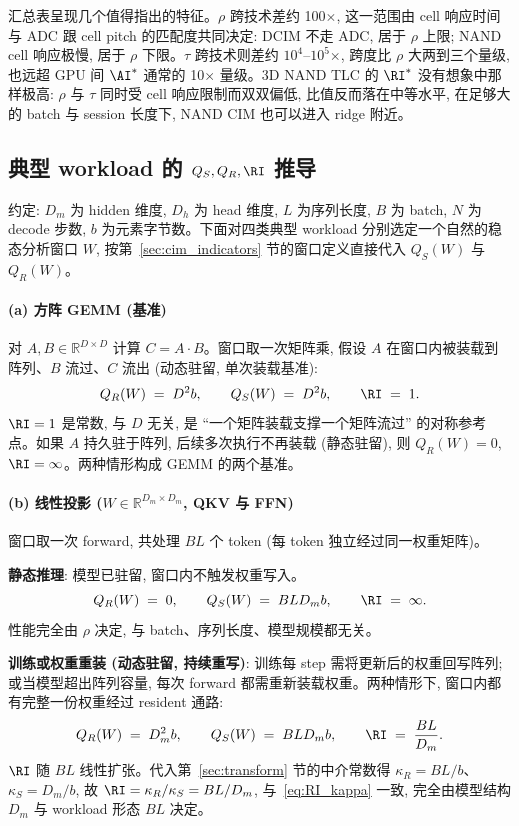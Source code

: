 汇总表呈现几个值得指出的特征。$\rho$ 跨技术差约 100$\times$, 这一范围由 cell 响应时间与 ADC 跟 cell pitch 的匹配度共同决定: DCIM 不走 ADC, 居于 $\rho$ 上限; NAND cell 响应极慢, 居于 $\rho$ 下限。$\tau$ 跨技术则差约 $10^4$--$10^5$$\times$, 跨度比 $\rho$ 大两到三个量级, 也远超 GPU 间 $\AI^{*}$ 通常的 10$\times$ 量级。3D NAND TLC 的 $\RI^{*}$ 没有想象中那样极高: $\rho$ 与 $\tau$ 同时受 cell 响应限制而双双偏低, 比值反而落在中等水平, 在足够大的 batch 与 session 长度下, NAND CIM 也可以进入 ridge 附近。

\subsection{典型 workload 的 $Q_S, Q_R, \RI$ 推导}
\label{sec:wl_quant}

约定: $D_m$ 为 hidden 维度, $D_h$ 为 head 维度, $L$ 为序列长度, $B$ 为 batch, $N$ 为 decode 步数, $b$ 为元素字节数。下面对四类典型 workload 分别选定一个自然的稳态分析窗口 $W$, 按第~\ref{sec:cim_indicators} 节的窗口定义直接代入 $Q_S(W)$ 与 $Q_R(W)$。

\paragraph{(a) 方阵 GEMM (基准)}
对 $A, B \in \mathbb{R}^{D \times D}$ 计算 $C = A \cdot B$。窗口取一次矩阵乘, 假设 $A$ 在窗口内被装载到阵列、$B$ 流过、$C$ 流出 (动态驻留, 单次装载基准):
\[
Q_R(W) \;=\; D^2 b, \qquad Q_S(W) \;=\; D^2 b, \qquad \RI \;=\; 1.
\]
$\RI = 1$ 是常数, 与 $D$ 无关, 是 “一个矩阵装载支撑一个矩阵流过” 的对称参考点。如果 $A$ 持久驻于阵列, 后续多次执行不再装载 (静态驻留), 则 $Q_R(W) = 0$, $\RI = \infty$。两种情形构成 GEMM 的两个基准。

\paragraph{(b) 线性投影 ($W \in \mathbb{R}^{D_m \times D_m}$, QKV 与 FFN)}
窗口取一次 forward, 共处理 $BL$ 个 token (每 token 独立经过同一权重矩阵)。

\textbf{静态推理}: 模型已驻留, 窗口内不触发权重写入。
\[
Q_R(W) \;=\; 0, \qquad Q_S(W) \;=\; BLD_m b, \qquad \RI \;=\; \infty.
\]
性能完全由 $\rho$ 决定, 与 batch、序列长度、模型规模都无关。

\textbf{训练或权重重装 (动态驻留, 持续重写)}: 训练每 step 需将更新后的权重回写阵列; 或当模型超出阵列容量, 每次 forward 都需重新装载权重。两种情形下, 窗口内都有完整一份权重经过 resident 通路:
\[
Q_R(W) \;=\; D_m^2 b, \qquad Q_S(W) \;=\; BLD_m b, \qquad \RI \;=\; \frac{BL}{D_m}.
\]
$\RI$ 随 $BL$ 线性扩张。代入第~\ref{sec:transform} 节的中介常数得 $\kappa_R = BL/b$、$\kappa_S = D_m/b$, 故 $\RI = \kappa_R/\kappa_S = BL/D_m$, 与~\eqref{eq:RI_kappa} 一致, 完全由模型结构 $D_m$ 与 workload 形态 $BL$ 决定。

